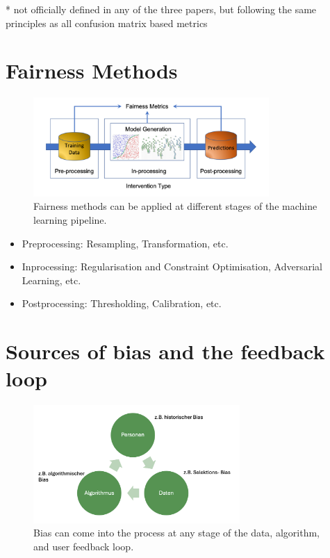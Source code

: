\documentclass[11pt,a4paper]{article}
\begin{document}
* not officially defined in any of the three papers, but following the same principles as all confusion matrix based metrics

\section{Fairness Methods}
\begin{figure}[h]
    \centering
    \includegraphics[width=0.8\textwidth]{../figures/fairness_methods.png}
    \caption{Fairness methods can be applied at different stages of the machine learning pipeline\parencite{caton2024}.}
\end{figure}
\begin{itemize}
    \item Preprocessing: Resampling, Transformation, etc.
    \item Inprocessing: Regularisation and Constraint Optimisation, Adversarial Learning, etc.
    \item Postprocessing: Thresholding, Calibration, etc.
\end{itemize}

\section{Sources of bias and the feedback loop}
\begin{figure}[h]
    \centering
    \includegraphics[width=0.7\textwidth]{../figures/bias_loop.png}
    \caption{Bias can come into the process at any stage of the data, algorithm, and user feedback loop\parencite{mehrabi2022}.}
\end{figure} 

\renewcommand{\bibfont}{\scriptsize}  %
\printbibliography
\end{document}
